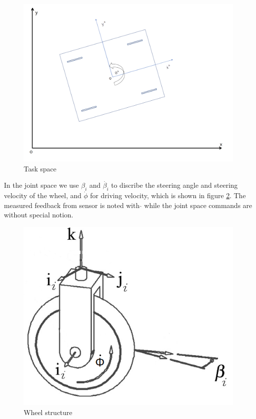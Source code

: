 \begin{figure}[t]
	\begin{center}
	\includegraphics[width=\textwidth]{../Figures/frame.png}
	\caption{Task space}
	\label{fig:taskSpace}
	\end{center}
\end{figure}


In the joint space we use $\beta_{i}$ and $\dot{\beta_{i}}$ to discribe the steering angle and steering velocity of the wheel, and $\dot{\phi}$ for driving velocity, which is shown in figure \cref{fig:wheel}. The measured
feedback from sensor is noted with $\hat{}$ while the joint space commands are without special notion. 

\begin{figure}[t]
\begin{center}
\includegraphics[width=.7\textwidth]{../Figures/wheel.png}
\caption{Wheel structure}
\label{fig:wheel}
\end{center}
\end{figure}





